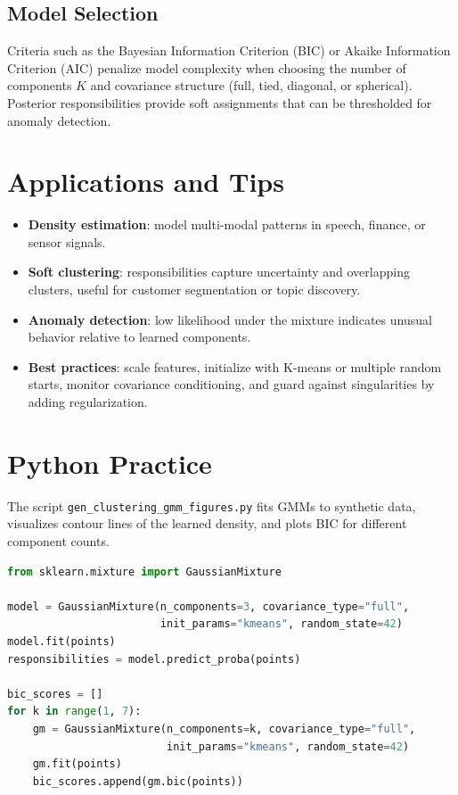 ﻿\documentclass[12pt]{article}
\begin{document}
\subsection{Model Selection}
Criteria such as the Bayesian Information Criterion (BIC) or Akaike Information Criterion (AIC) penalize model complexity when choosing the number of components \(K\) and covariance structure (full, tied, diagonal, or spherical). Posterior responsibilities provide soft assignments that can be thresholded for anomaly detection.

\section{Applications and Tips}
\begin{itemize}
  \item \textbf{Density estimation}: model multi-modal patterns in speech, finance, or sensor signals.
  \item \textbf{Soft clustering}: responsibilities capture uncertainty and overlapping clusters, useful for customer segmentation or topic discovery.
  \item \textbf{Anomaly detection}: low likelihood under the mixture indicates unusual behavior relative to learned components.
  \item \textbf{Best practices}: scale features, initialize with K-means or multiple random starts, monitor covariance conditioning, and guard against singularities by adding regularization.
\end{itemize}

\section{Python Practice}
The script \texttt{gen\_clustering\_gmm\_figures.py} fits GMMs to synthetic data, visualizes contour lines of the learned density, and plots BIC for different component counts.
\begin{lstlisting}[language=Python,caption={Excerpt from gen_clustering_gmm_figures.py}]
from sklearn.mixture import GaussianMixture

model = GaussianMixture(n_components=3, covariance_type="full",
                        init_params="kmeans", random_state=42)
model.fit(points)
responsibilities = model.predict_proba(points)

bic_scores = []
for k in range(1, 7):
    gm = GaussianMixture(n_components=k, covariance_type="full",
                         init_params="kmeans", random_state=42)
    gm.fit(points)
    bic_scores.append(gm.bic(points))
\end{lstlisting}
\end{document}
